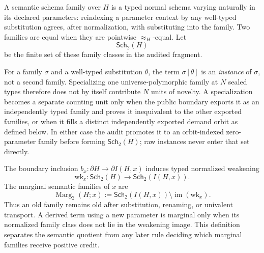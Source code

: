 \begin{definition}
\label{def:schema-family-instance}
A semantic schema family over \(H\) is a typed normal schema varying naturally
in its declared parameters: reindexing a parameter context by any well-typed
substitution agrees, after normalization, with substituting into the family.
Two families are equal when they are pointwise \(\approx_H\)-equal. Let
\[
  \mathsf{Sch}_2(H)
\]
be the finite set of these family classes in the audited fragment.

For a family \(\sigma\) and a well-typed substitution \(\theta\), the term
\(\sigma[\theta]\) is an \emph{instance} of \(\sigma\), not a second family.
Specializing one universe-polymorphic family at \(N\) sealed types therefore
does not by itself contribute \(N\) units of novelty. A specialization becomes
a separate counting unit only when the public boundary exports it as an
independently typed family and proves it inequivalent to the other exported
families, or when it fills a distinct independently exported demand orbit as
defined below. In either case the audit promotes it to an orbit-indexed
zero-parameter family before forming \(\mathsf{Sch}_2(H)\); raw instances never
enter that set directly.
\end{definition}

\begin{definition}
\label{def:schema-weakening-marginality}
The boundary inclusion \(b_x:\partial H\to\partial I(H,x)\) induces typed
normalized weakening
\[
  \mathrm{wk}_x:\mathsf{Sch}_2(H)\longrightarrow
  \mathsf{Sch}_2(I(H,x)).
\]
The marginal semantic families of \(x\) are
\[
  \operatorname{Marg}_2(H;x)
  :=
  \mathsf{Sch}_2(I(H,x))\setminus\operatorname{im}(\mathrm{wk}_x).
\]
Thus an old family remains old after substitution, renaming, or univalent
transport. A derived term using a new parameter is marginal only when its
normalized family class does not lie in the weakening image. This definition
separates the semantic quotient from any later rule deciding which marginal
families receive positive credit.
\end{definition}

